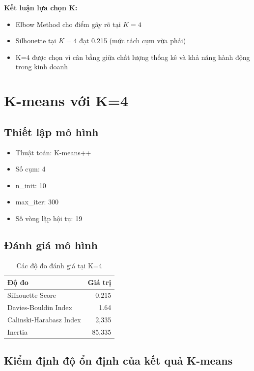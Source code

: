 \textbf{Kết luận lựa chọn K:}
\begin{itemize}
    \item Elbow Method cho điểm gãy rõ tại $K=4$
    \item Silhouette tại $K=4$ đạt 0.215 (mức tách cụm vừa phải)
    \item K=4 được chọn vì cân bằng giữa chất lượng thống kê và khả năng hành động trong kinh doanh
\end{itemize}

\section{K-means với K=4}

\subsection{Thiết lập mô hình}

\begin{itemize}
    \item Thuật toán: K-means++
    \item Số cụm: 4
    \item n\_init: 10
    \item max\_iter: 300
    \item Số vòng lặp hội tụ: 19
\end{itemize}

\subsection{Đánh giá mô hình}

\begin{table}[H]
\centering
\caption{Các độ đo đánh giá tại K=4}
\begin{tabular}{|l|r|}
\hline
\textbf{Độ đo} & \textbf{Giá trị} \\
\hline
Silhouette Score & 0.215 \\
\hline
Davies-Bouldin Index & 1.64 \\
\hline
Calinski-Harabasz Index & 2,335 \\
\hline
Inertia & 85,335 \\
\hline
\end{tabular}
\end{table}

\subsection{Kiểm định độ ổn định của kết quả K-means}

